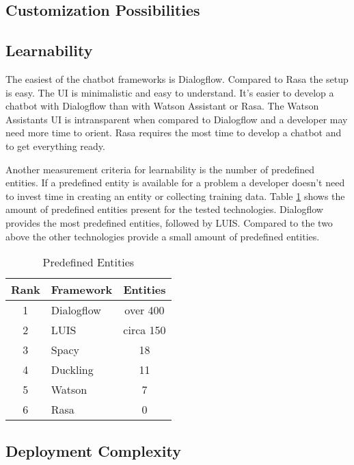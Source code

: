 \subsection*{Customization Possibilities}
\subsection*{Learnability}
The easiest of the chatbot frameworks is Dialogflow.
Compared to Rasa the setup is easy.
The UI is minimalistic and easy to understand.
It's easier to develop a chatbot with Dialogflow than with Watson Assistant or Rasa.
The Watson Assistants UI is intransparent when compared to Dialogflow and a developer 
may need more time to orient.
Rasa requires the most time to develop a chatbot and to get everything ready.

Another measurement criteria for learnability is the number of predefined entities.
If a predefined entity is available for a problem a developer doesn't need to 
invest time in creating an entity or collecting training data. 
Table \ref{tab:predefined_entities} shows the amount of predefined entities 
present for the tested technologies.
Dialogflow provides the most predefined entities, followed by LUIS.
Compared to the two above the other technologies provide a small amount of predefined entities.
\begin{table}[H]
    \centering
    \begin{tabular}{ c | l | c }
        Rank & Framework &  Entities \\ \hline \hline
        1 & \multirow{1}{*}{Dialogflow} & over 400 \\
        2 & \multirow{1}{*}{LUIS} & circa 150 \\
        3 & \multirow{1}{*}{Spacy} & 18 \\
        4 & \multirow{1}{*}{Duckling} & 11 \\
        5 & \multirow{1}{*}{Watson} & 7  \\
        6 & \multirow{1}{*}{Rasa} & 0 \\
    \end{tabular}
    \caption{Predefined Entities} \label{tab:predefined_entities}
\end{table} \noindent
\subsection*{Deployment Complexity}


